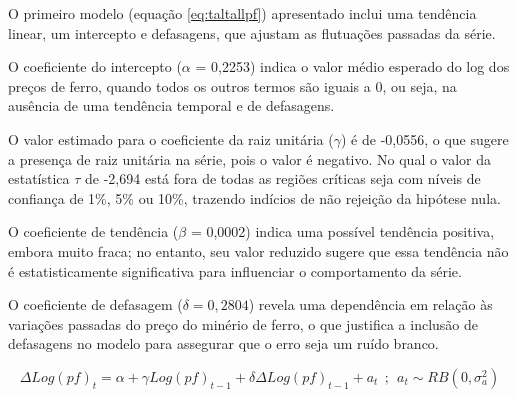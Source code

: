 \documentclass[a4paper,12pt]{article}[abntex2]
\begin{document}
O primeiro modelo (equação \ref{eq:taltallpf}) apresentado inclui uma tendência linear, um intercepto e defasagens, que ajustam as flutuações passadas da série.

O coeficiente do intercepto ($\alpha$ = 0,2253) indica o valor médio esperado do log dos preços de ferro, quando todos os outros termos são iguais a 0, ou seja, na ausência de uma tendência temporal e de defasagens.

O valor estimado para o coeficiente da raiz unitária ($\gamma$) é de -0,0556, o que sugere a presença de raiz unitária na série, pois o valor é negativo. No qual o valor da estatística $\tau$ de -2,694 está fora de todas as regiões críticas seja com níveis de confiança de 1\%, 5\% ou 10\%, trazendo indícios de não rejeição da hipótese nula.

O coeficiente de tendência ($\beta$ = 0,0002) indica uma possível tendência positiva, embora muito fraca; no entanto, seu valor reduzido sugere que essa tendência não é estatisticamente significativa para influenciar o comportamento da série. 

O coeficiente de defasagem ($\delta = 0,2804$) revela uma dependência em relação às variações passadas do preço do minério de ferro, o que justifica a inclusão de defasagens no modelo para assegurar que o erro seja um ruído branco.



\begin{equation}
    \Delta Log(pf)_t = \alpha + \gamma Log(pf)_{t-1} + \delta \Delta Log(pf)_{t-1} + a_t \ \ ; \ \ a_t \sim RB(0, \sigma_a^2)   
    \label{eq:talinterceptopf}
\end{equation}
\end{document}

